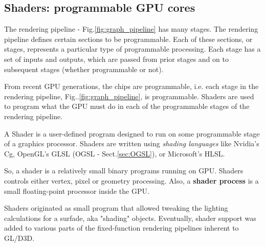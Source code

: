 \subsection{Shaders: programmable GPU cores}
\label{sec:shader}

\begin{mdframed}

The rendering pipeline - Fig.\ref{fig:graph_pipeline} has many stages.
The rendering pipeline defines certain sections to be programmable. Each of
these sections, or stages, represents a particular type of programmable
processing. Each stage has a set of inputs and outputs, which are passed from
prior stages and on to subsequent stages (whether programmable or not).

\end{mdframed}

From recent GPU generations, the chips are programmable, i.e. each stage in the
rendering pipeline, Fig..\ref{fig:graph_pipeline}, is programmable.
Shaders are used to program what the GPU must do in each of the programmable
stages of the rendering pipeline.

A Shader is a user-defined program designed to run on some programmable stage of
a graphics processor. Shaders are written using {\it shading languages} like
Nvidia's Cg, OpenGL's GLSL (OGSL - Sect.\ref{sec:OGSL}), or Microsoft's HLSL.

So, a shader is a relatively small binary programs running on GPU.
Shaders controls either vertex, pixel or geometry processing. Also, a {\bf
shader process} is a small floating-point processor inside the GPU.

Shaders originated as small program that allowed tweaking the lighting
calculations for a surfade, aka "shading" objects. Eventually, shader support
was added to various parts of the fixed-function rendering pipelines inherent to
GL/D3D.


